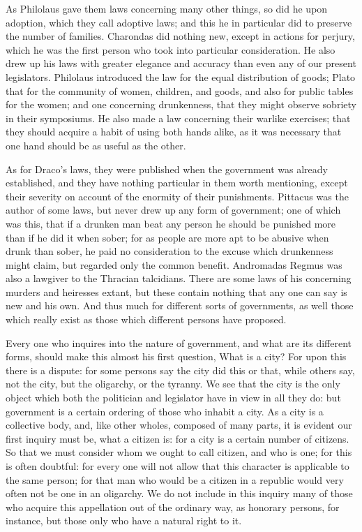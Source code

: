 As Philolaus gave them laws concerning many other things, so did he upon
adoption, which they call adoptive laws; and this he in particular did to
preserve the number of families. Charondas did nothing new, except in
actions for perjury, which he was the first person who took into
particular consideration. He also drew up his laws with greater elegance
and accuracy than even any of our present legislators. Philolaus
introduced the law for the equal distribution of goods; Plato that for the
community of women, children, and goods, and also for public tables for
the women; and one concerning drunkenness, that they might observe
sobriety in their symposiums. He also made a law concerning their warlike
exercises; that they should acquire a habit of using both hands alike, as
it was necessary that one hand should be as useful as the other.

As for Draco's laws, they were published when the government was already
established, and they have nothing particular in them worth mentioning,
except their severity on account of the enormity of their punishments.
Pittacus was the author of some laws, but never drew up any form of
government; one of which was this, that if a drunken man beat any person
he should be punished more than if he did it when sober; for as people are
more apt to be abusive when drunk than sober, he paid no consideration to
the excuse which drunkenness might claim, but regarded only the common
benefit. Andromadas Regmus was also a lawgiver to the Thracian talcidians.
There are some laws of his concerning murders and heiresses extant, but
these contain nothing that any one can say is new and his own. And thus
much for different sorts of governments, as well those which really exist
as those which different persons have proposed.



Every one who inquires into the nature of government, and what are its
different forms, should make this almost his first question, What is a
city? For upon this there is a dispute: for some persons say the city did
this or that, while others say, not the city, but the oligarchy, or the
tyranny. We see that the city is the only object which both the politician
and legislator have in view in all they do: but government is a certain
ordering of those who inhabit a city. As a city is a collective body, and,
like other wholes, composed of many parts, it is evident our first inquiry
must be, what a citizen is: for a city is a certain number of citizens. So
that we must consider whom we ought to call citizen, and who is one; for
this is often doubtful: for every one will not allow that this character
is applicable to the same person; for that man who would be a citizen in a
republic would very often not be one in an oligarchy. We do not include in
this inquiry many of those who acquire this appellation out of the
ordinary way, as honorary persons, for instance, but those only who have a
natural right to it.

